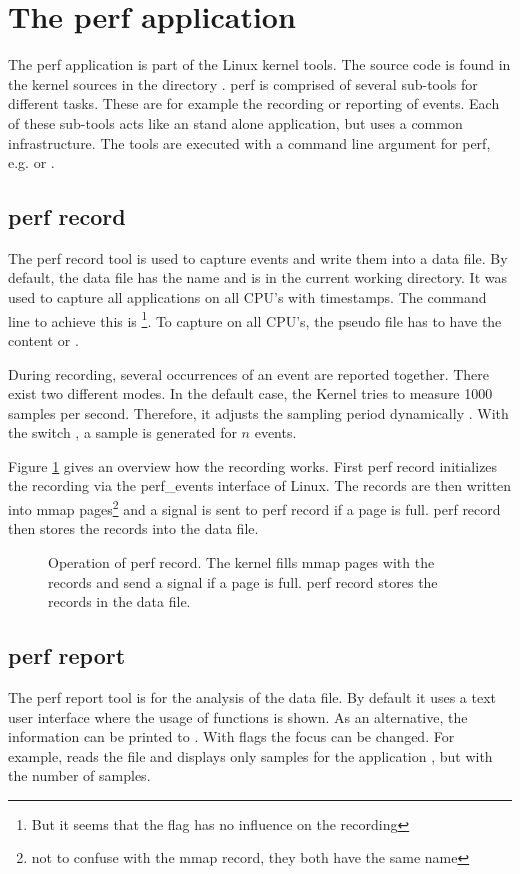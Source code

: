 \section{The perf application}
The perf application is part of the Linux kernel tools. The source code is found in the kernel sources in the directory . perf is comprised of several sub-tools for different tasks. These are for example the recording or reporting of events. Each of these sub-tools acts like an stand alone application, but uses a common infrastructure. The tools are executed with a command line argument for perf, e.g.  or .

\subsection{perf record}
The perf record tool is used to capture events and write them into a data file. By default, the data file has the name  and is in the current working directory. It was used to capture all applications on all CPU's with timestamps. The command line to achieve this is \footnote{But it seems that the  flag has no influence on the recording}. To capture on all CPU's, the pseudo file  has to have the content  or .

During recording, several occurrences of an event are reported together. There exist two different modes. In the default case, the Kernel tries to measure 1000 samples per second. Therefore, it adjusts the sampling period dynamically \cite{kernel.org2011}. With the switch , a sample is generated for $n$ events.

Figure \ref{fig:perfRecord} gives an overview how the recording works. First perf record initializes the recording via the perf\_events interface of Linux. The records are then written into mmap pages\footnote{not to confuse with the mmap record, they both have the same name} and a signal is sent to perf record if a page is full. perf record then stores the records into the data file.

\begin{figure}[ht]
  \center
  
  \caption[Operation of perf record]{Operation of perf record. The kernel fills mmap pages with the records and send a signal if a page is full. perf record stores the records in the data file.\label{fig:perfRecord}}
\end{figure}

\subsection{perf report}
The perf report tool is for the analysis of the data file. By default it uses a text user interface where the usage of functions is shown. As an alternative, the information can be printed to . With flags the focus can be changed. For example,  reads the file  and displays only samples for the application , but with the number of samples.

